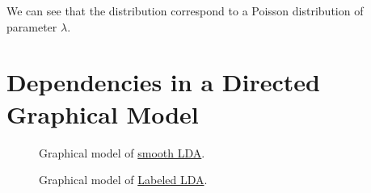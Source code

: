 \documentclass{article}
\begin{document}
We can see that the distribution correspond to a Poisson distribution of parameter $\lambda$.

\section{Dependencies in a Directed Graphical Model}

\begin{figure}[h]
    \centering
    
    \caption{Graphical model of \href{https://www.jmlr.org/papers/volume3/blei03a/blei03a.pdf}{smooth LDA}.}
    \label{fig:fig1}
\end{figure}

\begin{figure}[h]
    \centering
    
    \caption{Graphical model of \href{https://aclanthology.org/D09-1026.pdf}{Labeled LDA}.}
    \label{fig:fig2}
\end{figure}
\end{document}
